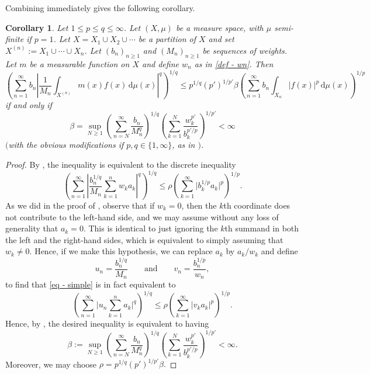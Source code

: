 \documentclass[oneside,10pt]{article}          %
\newtheorem{cor}[thm]{Corollary}
\numberwithin{equation}{section}
\begin{document}
Combining  immediately gives the following corollary.


\begin{cor}\label{cor - charac}
Let $1\leq p\leq q\leq\infty$. Let $(X,\mu)$ be a measure space, with $\mu$ semi-finite if $p=1$. Let $X = X_1 \cup X_2 \cup \cdots$ be a partition of $X$ and set $X^{(n)} := X_1 \cup \cdots \cup X_n$. Let $(b_n)_{n\geq 1}$ and $(M_n)_{n\geq 1}$ be sequences of weights. Let $m$ be a measurable function on $X$ and define $w_n$ as in \eqref{def - wn}. Then
\begin{equation*}\label{eq - charac-bound}
    \left(\sum_{n=1}^{\infty} b_n \left| \frac{1}{M_n} \int_{X^{(n)}}m(x)f(x)\,\mathrm{d}\mu(x) \right|^q \right)^{\!\!1/q}\!\! \leq p^{1/q}(p')^{1/p'} \beta \left( \sum_{n=1}^{\infty} b_n \int_{X_n}|f(x)|^p\,\mathrm{d}\mu(x) \right)^{\!\!1/p}
\end{equation*}
if and only if
\[
\beta = \sup_{N\ge1} \left(\sum_{n=N}^{\infty} \frac{b_n}{M_n^q}\right)^{\!\!1/q}\! \left(\sum_{k=1}^N \frac{w_k^{p'}}{b_k^{p'/p}}\right)^{\!\!1/p'}\!
<\infty
\]
\!$($\!with the obvious modifications if $p,q\in\{1,\infty\}$, as in \!$)$.
\end{cor}

\begin{proof}
    By , the inequality is equivalent to the discrete inequality 
    \begin{equation}\label{eq - simple}
         \left(\sum_{n=1}^{\infty} \left|\frac{b_n^{1/q}}{M_n} \sum_{k=1}^{n}w_k a_k \right|^q \right)^{\!\!1/q}\! \leq \rho \left(\sum_{k=1}^{\infty} \big|b_k^{1/p}a_k\big|^p\right)^{\!\!1/p}.
    \end{equation}
    As we did in the proof of , observe that if $w_k= 0$, then the $k$th coordinate does not contribute to the left-hand side, and we may assume without any loss of generality that $a_k=0$. This is identical to just ignoring the $k$th summand in both the left and the right-hand sides, which is equivalent to simply assuming that $w_k\neq 0$. Hence, if we make this hypothesis, we can replace $a_k$ by $a_k/w_k$ and define 
    \[
    u_n=\frac{b_n^{1/q}}{M_n}
    \qquad\text{and}\qquad
    v_n=\frac{b_n^{1/p}}{w_n},
    \]
    to find that \eqref{eq - simple} is in fact equivalent to 
    \[
    \left(\sum_{n=1}^{\infty} \bigg| u_n\sum_{k=1}^n a_k \bigg|^q \right)^{\!\!1/q}\!\! \le \rho \left(\sum_{k=1}^{\infty}|v_ka_k|^p \right)^{\!\!1/p}.
    \]
    Hence, by , the desired inequality is equivalent to having
    \[
    \beta := \sup_{N\ge1} \left(\sum_{n=N}^{\infty} \frac{b_n}{M_n^q}\right)^{\!\!1/q}\! \left(\sum_{k=1}^N \frac{w_k^{p'}}{b_k^{p'/p}}\right)^{\!\!1/p'}\!
    <\infty .
    \]
    Moreover, we may choose $\rho = p^{1/q}(p')^{1/p'}\beta .$
\end{proof}
\end{document}
